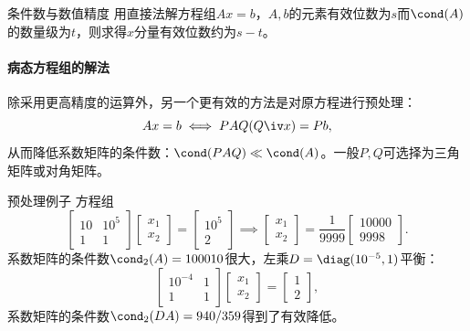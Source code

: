 \begin{theorem}
    {条件数与数值精度}{}
    用直接法解方程组$Ax=b$，$A,b$的元素有效位数为$s$而$\cond(A)$的数量级为$t$，则求得$x$分量有效位数约为$s-t$。
\end{theorem}

\paragraph{病态方程组的解法}

除采用更高精度的运算外，另一个更有效的方法是对原方程进行预处理：
\[
    Ax=b\iff PAQ(Q\iv x)=Pb,
\]
从而降低系数矩阵的条件数：$\cond(PAQ)\ll\cond(A)$。一般$P,Q$可选择为三角矩阵或对角矩阵。

\begin{example}
    {预处理例子}{}
    方程组
    \[
        \begin{bmatrix}
            10&10^5\\1&1
        \end{bmatrix}\begin{bmatrix}
            x_1\\x_2
        \end{bmatrix}=\begin{bmatrix}
            10^5\\2
        \end{bmatrix}\implies\begin{bmatrix}
            x_1\\x_2
        \end{bmatrix}=\frac1{9999}\begin{bmatrix}
            10000\\9998
        \end{bmatrix}.
    \]
    系数矩阵的条件数$\cond_2(A)=100010$很大，左乘$D=\diag(10^{-5},1)$平衡：
    \[
        \begin{bmatrix}
            10^{-4}&1\\1&1
        \end{bmatrix}\begin{bmatrix}
            x_1\\x_2
        \end{bmatrix}=\begin{bmatrix}
            1\\2
        \end{bmatrix},
    \]
    系数矩阵的条件数$\cond_2(DA)=940/359$得到了有效降低。
\end{example}
